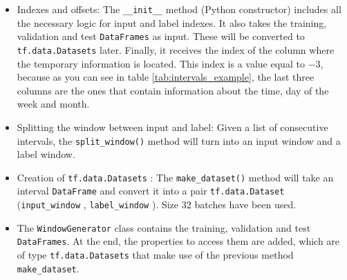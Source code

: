 \begin{itemize}
    \item Indexes and offsets: The \small{\verb|__init__|} \normalsize method (Python constructor) includes all the necessary logic for input and label indexes. It also takes the training, validation and test \small{\verb|DataFrames|} \normalsize as input. These will be converted to \small{\verb|tf.data.Datasets|} \normalsize later. Finally, it receives the index of the column where the temporary information is located. This index is a value equal to $-3$, because as you can see in table \ref{tab:intervals_example}, the last three columns are the ones that contain information about the time, day of the week and month.
    
    \item Splitting the window between input and label: Given a list of consecutive intervals, the \small{\verb|split_window()|} \normalsize method will turn into an input window and a label window.

    
    \item Creation of \small{\verb|tf.data.Datasets|} \normalsize: The \small{\verb|make_dataset()|} \normalsize method will take an interval \small{\verb|DataFrame|} \normalsize and convert it into a pair \small{\verb|tf.data.Dataset|} \normalsize (\small{\verb|input_window|} \normalsize, \small{\verb|label_window|} \normalsize). Size 32 batches have been used.
    
    
    \item The \small{\verb|WindowGenerator|} \normalsize class contains the training, validation and test \small{\verb|DataFrames|}\normalsize. At the end, the properties to access them are added, which are of type \newline\small{\verb|tf.data.Datasets|} \normalsize that make use of the previous method \small\verb|make_dataset|\normalsize.

\end{itemize}